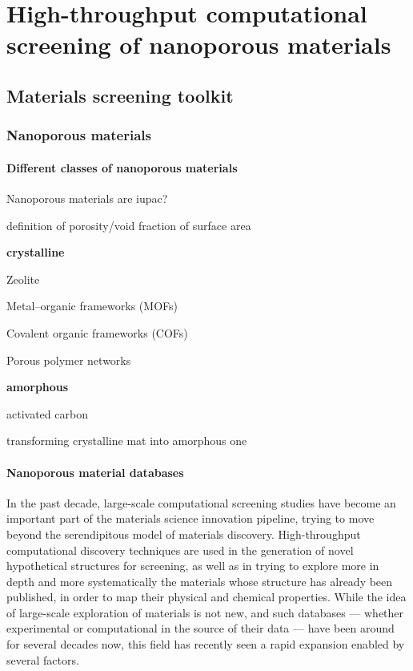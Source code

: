 \documentclass[main.tex]{subfiles}
\begin{document}
\chapter{High-throughput computational screening of nanoporous materials}
\vspace*{-1\baselineskip}


\section{Materials screening toolkit}

\subsection{Nanoporous materials}

\subsubsection{Different classes of nanoporous materials}

Nanoporous materials are iupac?

definition of porosity/void fraction of surface area 

\textbf{crystalline}

Zeolite

Metal--organic frameworks (MOFs)

Covalent organic frameworks (COFs)

Porous polymer networks

\textbf{amorphous}

activated carbon 

transforming crystalline mat into amorphous one

\subsubsection{Nanoporous material databases}


In the past decade, large-scale computational screening studies have become an important part of the materials science innovation pipeline,\cite{Hautier_2019, Cole_2020} trying to move beyond the serendipitous model of materials discovery.\cite{Ludwig_2019, Stein_2019} High-throughput computational discovery techniques are used in the generation of novel hypothetical structures for screening,\cite{Wilmer_2012, Boyd_2016} as well as in trying to explore more in depth and more systematically the materials whose structure has already been published, in order to map their physical and chemical properties.\cite{GomezGualdron_2014,Moliner_2019,SalcedoPerez_2019} While the idea of large-scale exploration of materials is not new, and such databases --- whether experimental or computational in the source of their data --- have been around for several decades now,\cite{PDB_1971, Grazulis_2009, Groom_2016} this field has recently seen a rapid expansion enabled by several factors. 
\end{document}
